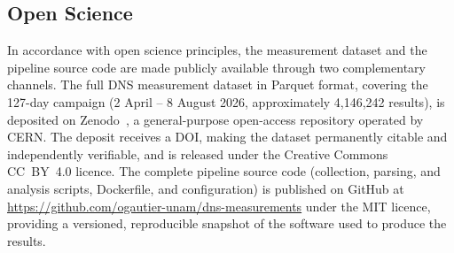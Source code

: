 \subsection{Open Science}
\label{subsec:3.6.3}

In accordance with open science principles, the measurement dataset and the pipeline source code are made publicly available through two complementary channels. The full \ac{DNS} measurement dataset in Parquet format, covering the 127-day campaign (2 April -- 8 August 2026, approximately 4,146,242 results), is deposited on Zenodo~\cite{Zenodo}, a general-purpose open-access repository operated by CERN. The deposit receives a \ac{DOI}, making the dataset permanently citable and independently verifiable, and is released under the Creative Commons CC~BY~4.0 licence. The complete pipeline source code (collection, parsing, and analysis scripts, Dockerfile, and configuration) is published on GitHub at \url{https://github.com/ogautier-unam/dns-measurements} under the MIT licence, providing a versioned, reproducible snapshot of the software used to produce the results.
